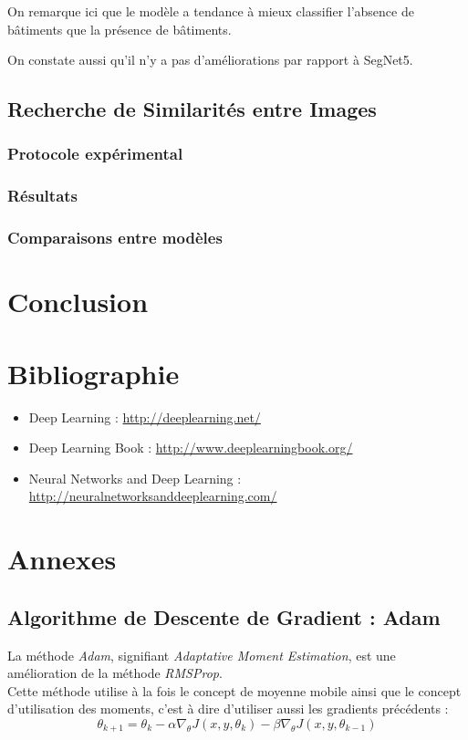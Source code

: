 \documentclass[a4paper, 11pt]{report}
\begin{document}
On remarque ici que le modèle a tendance à mieux classifier l'absence de bâtiments que la présence de bâtiments.

On constate aussi qu'il n'y a pas d'améliorations par rapport à SegNet5.
\section{Recherche de Similarités entre Images}
\subsection{Protocole expérimental}
\subsection{Résultats}
\subsection{Comparaisons entre modèles}
\chapter{Conclusion}
\chapter*{Bibliographie}
\begin{itemize}
	\item Deep Learning : \url{http://deeplearning.net/}
	\item Deep Learning Book : \url{http://www.deeplearningbook.org/}
	\item Neural Networks and Deep Learning : \url{http://neuralnetworksanddeeplearning.com/}
\end{itemize}
\chapter*{Annexes}
\section{Algorithme de Descente de Gradient : Adam}
La méthode \emph{Adam}, signifiant \emph{Adaptative Moment Estimation}, est une amélioration de la méthode \emph{RMSProp}.\\
Cette méthode utilise à la fois le concept de moyenne mobile ainsi que le concept d'utilisation des moments, c'est à dire d'utiliser aussi les gradients précédents :
$$\theta_{k+1} = \theta_k - \alpha \nabla_\theta J(x,y,\theta_k) - \beta \nabla_\theta J(x,y,\theta_{k-1})$$
\end{document}

